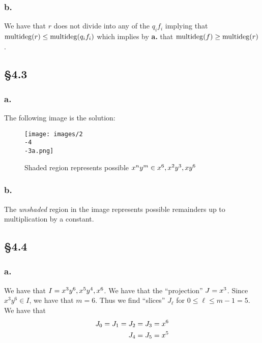 \documentclass[letterpaper]{article}
\begin{document}
\subsubsection*{b.}

We have that $r$ does not divide into any of the $q_{i}f_{i}$ implying that $\operatorname{multideg}(r) \leq \operatorname{multideg}(q_{i} f_{i})$ which implies by \textbf{a.} that $\operatorname{multideg}(f) \geq \operatorname{multideg}(r)$.

\subsection*{\S 4.3}

\subsubsection*{a.}

The following image is the solution:

\begin{figure}[H]
  \centering
  \texttt{[image: images/2\\-4\\-3a.png]}
  \caption{Shaded region represents possible $x^{n}y^{m} \in \gen{x^{6}, x^{2}y^{3}, xy^{6}}$}
\end{figure}

\subsubsection*{b.}

The \emph{unshaded} region in the image represents possible remainders up to multiplication by a constant.

\clearpage

\subsection*{\S 4.4}

\subsubsection*{a.}

We have that $I = \gen{x^{3}y^{6}, x^{5}y^{4}, x^{6}}$.
We have that the ``projection'' $J = \gen{x^{3}}$.
Since $x^{3}y^{6} \in I$, we have that $m = 6$.
Thus we find ``slices'' $J_{\ell}$ for $0 \leq \ell \leq m - 1 = 5$.
We have that
\begin{align*}
  J_{0} = J_{1} = J_{2} = J_{3} &= \gen{x^{6}} \\
  J_{4} = J_{5} &= \gen{x^{5}} \\
\end{align*}
\end{document}
